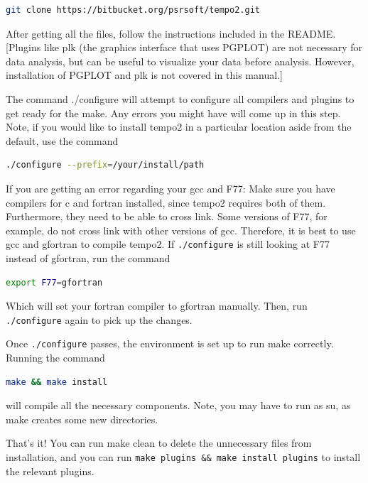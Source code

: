 \documentclass[12pt]{article}
\begin{document}
\begin{lstlisting}[language=bash]
git clone https://bitbucket.org/psrsoft/tempo2.git
\end{lstlisting}

After getting all the files, follow the instructions included in the README.
[Plugins like plk (the graphics interface that uses PGPLOT) are not necessary for
data analysis, but can be useful to visualize your data before analysis.
However, installation of PGPLOT and plk is not covered in this manual.]

The command ./configure will attempt to configure all compilers and plugins to
get ready for the make. Any errors you might have will come up in this step.
Note, if you would like to install tempo2 in a particular location aside from
the default, use the command
	
\begin{lstlisting}[language=bash]
./configure --prefix=/your/install/path
\end{lstlisting}

If you are getting an error regarding your gcc and F77:
Make sure you have compilers for c and fortran installed, since tempo2 requires
both of them. Furthermore, they need to be able to cross link.
Some versions of F77, for example, do not cross link with other versions of gcc.
Therefore, it is best to use gcc and gfortran to compile tempo2. If
\texttt{./configure}
is still looking at F77 instead of gfortran, run the command

\begin{lstlisting}[language=bash]
export F77=gfortran
\end{lstlisting}

Which will set your fortran compiler to gfortran manually. Then, run
\texttt{./configure}
again to pick up the changes.

Once \texttt{./configure} passes, the environment is set up to run make correctly.
Running the command

\begin{lstlisting}[language=bash]
make && make install
\end{lstlisting}

will compile all the necessary components. Note, you may have to run as su, as
make creates some new directories.

That's it! You can run make clean to delete the unnecessary files from
installation, and you can run \texttt{make plugins \&\& make install plugins} to install
the relevant plugins. 
\end{document}

